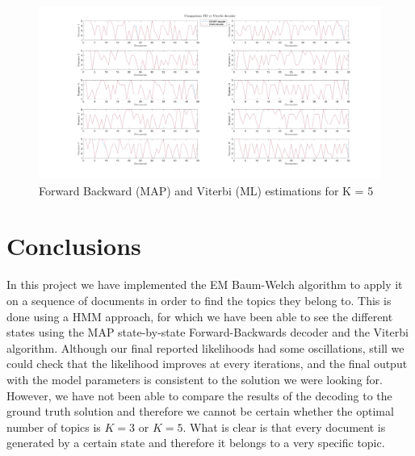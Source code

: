 \documentclass[12pt]{article}
\begin{document}
\begin{figure}[h]
	\centering
	\includegraphics[width=\textwidth]{images/comparison_FB_Viterbi_K_5.png}
	\caption{Forward Backward (MAP) and Viterbi (ML) estimations for K = 5}
	\label{fig:viterbi_5}
\end{figure}

\section{Conclusions}
In this project we have implemented the EM Baum-Welch algorithm to apply it on a sequence of documents in order to find the topics they belong to. This is done using a HMM approach, for which we have been able to see the different states using the MAP state-by-state Forward-Backwards decoder and the Viterbi algorithm.
Although our final reported likelihoods had some oscillations, still we could check that the likelihood improves at every iterations, and the final output with the model parameters is consistent to the solution we were looking for. However, we have not been able to compare the results of the decoding to the ground truth solution and therefore we cannot be certain whether the optimal number of topics is $K=3$ or $K=5$. What is clear is that every document is generated by a certain state and therefore it belongs to a very specific topic.
\clearpage
\nocite{*}
\printbibliography
\end{document}
